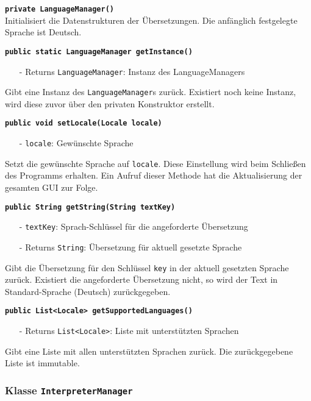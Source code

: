 \documentclass[parskip=full,11pt,twoside]{scrartcl}
\begin{document}
\textbf{\texttt{private LanguageManager()}}\\
Initialisiert die Datenstrukturen der Übersetzungen. Die anfänglich festgelegte Sprache ist Deutsch.

\textbf{\texttt{public static LanguageManager getInstance()}}
\begin{itemize}[noitemsep]
	\item[-] Returns \texttt{LanguageManager}: Instanz des LanguageManagers
\end{itemize}
Gibt eine Instanz des \texttt{LanguageManager}s zurück. Existiert noch keine Instanz, wird diese zuvor über den privaten Konstruktor erstellt.

\textbf{\texttt{public void setLocale(Locale locale)}}
\begin{itemize}[noitemsep]
	\item[-] \texttt{locale}: Gewünschte Sprache
\end{itemize}
Setzt die gewünschte Sprache auf \texttt{locale}. Diese Einstellung wird beim Schließen des Programms erhalten. Ein Aufruf dieser Methode hat die Aktualisierung der gesamten GUI zur Folge.

\textbf{\texttt{public String getString(String textKey)}}
\begin{itemize}[noitemsep]
	\item[-] \texttt{textKey}: Sprach-Schlüssel für die angeforderte Übersetzung
	\item[-] Returns \texttt{String}: Übersetzung für aktuell gesetzte Sprache
\end{itemize}
Gibt die Übersetzung für den Schlüssel \texttt{key} in der aktuell gesetzten Sprache zurück. Existiert die angeforderte Übersetzung nicht, so wird der Text in Standard-Sprache (Deutsch) zurückgegeben.

\textbf{\texttt{public List<Locale> getSupportedLanguages()}}
\begin{itemize}[noitemsep]
    \item[-] Returns \texttt{List<Locale>}: Liste mit unterstützten Sprachen
\end{itemize}
Gibt eine Liste mit allen unterstützten Sprachen zurück. Die zurückgegebene Liste ist immutable.

\subsubsection{Klasse \texttt{InterpreterManager}}
\end{document}
